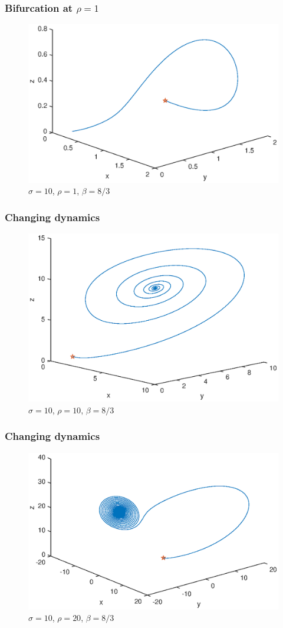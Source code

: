 \documentclass{beamer}
\begin{document}
\begin{frame}
    \frametitle{Bifurcation at $\rho=1$}
    \begin{figure}
        \includegraphics[width=0.7\linewidth]{r1}
        \caption{$\sigma = 10$, $\rho = 1$, $\beta = 8/3$}
    \end{figure}
\end{frame}


\begin{frame}
    \frametitle{Changing dynamics}
    \begin{figure}
        \includegraphics[width=0.7\linewidth]{r10}
        \caption{$\sigma = 10$, $\rho = 10$, $\beta = 8/3$}
    \end{figure}
\end{frame}


\begin{frame}
    \frametitle{Changing dynamics}
    \begin{figure}
        \includegraphics[width=0.7\linewidth]{r20}
        \caption{$\sigma = 10$, $\rho = 20$, $\beta = 8/3$}
    \end{figure}
\end{frame}
\end{document}
